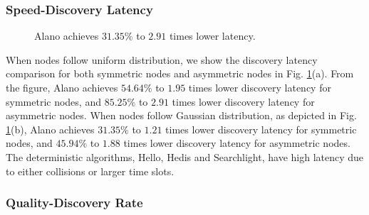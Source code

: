 \subsubsection{Speed-Discovery Latency}

\begin{figure}[!h]
\centering
{}
\hspace{0.01in}
\caption{Alano achieves $31.35\%$ to $2.91$ times lower latency.}
\label{fig_latency}
\end{figure}

When nodes follow uniform distribution, we show the discovery latency comparison for both symmetric nodes and asymmetric nodes in Fig. \ref{fig_latency}(a).
From the figure, Alano achieves $54.64\%$ to $1.95$ times lower discovery latency for symmetric nodes, and $85.25\%$ to $2.91$ times lower discovery latency for asymmetric nodes.
When nodes follow Gaussian distribution, as depicted in Fig. \ref{fig_latency}(b), 
Alano achieves $31.35\%$ to $1.21$ times lower discovery latency for symmetric nodes, 
and $45.94\%$ to $1.88$ times lower discovery latency for asymmetric nodes.
The deterministic algorithms, Hello, Hedis and Searchlight, have high latency due to either collisions or larger time slots. 


\subsubsection{Quality-Discovery Rate}




